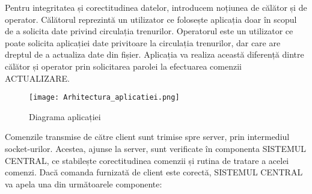 \documentclass[runningheads]{llncs}
\begin{document}
Pentru integritatea și corectitudinea datelor, introducem noțiunea de călător și de operator. Călătorul reprezintă un utilizator ce folosește aplicația doar în scopul de a solicita date privind circulația trenurilor. Operatorul este un utilizator ce poate solicita aplicației date privitoare la circulația trenurilor, dar care are dreptul de a actualiza date din fișier. Aplicația va realiza această diferență dintre călător și operator prin solicitarea parolei la efectuarea comenzii ACTUALIZARE.
\begin{figure}
    \centering
    \texttt{[image: Arhitectura\_aplicatiei.png]}
    \caption{Diagrama aplicației}
\end{figure}
Comenzile transmise de către client sunt trimise spre server, prin intermediul socket-urilor. Acestea, ajunse la server, sunt verificate în componenta SISTEMUL CENTRAL, ce stabilește corectitudinea comenzii și rutina de tratare a acelei comenzi. Dacă comanda furnizată de client este corectă, SISTEMUL CENTRAL va apela una din următoarele componente:
\end{document}
